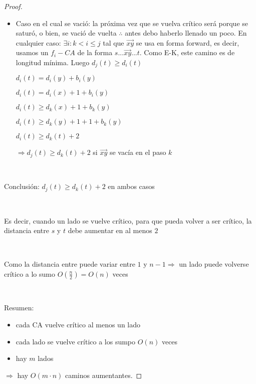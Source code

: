 \documentclass[11pt]{article}
\begin{document}
\begin{proof}
\begin{itemize}
\item Caso en el cual se vació: la próxima vez que se vuelva crítico será porque se saturó, o bien, se vació de vuelta $\therefore$ antes debo haberlo llenado un poco. En cualquier caso: $\exists i: k < i \le j$ tal que $\overrightarrow{xy}$ se usa en forma forward, es decir, usamos un $f_i-CA$ de la forma $s...\overrightarrow{xy}...t$. Como E-K, este camino es de longitud mínima. Luego $d_j(t) \ge d_i(t)$\par
	\begin{center}
		$d_i(t) = d_i(y) + b_i(y)$\par
		$d_i(t) = d_i(x) + 1 + b_i(y)$\par
		$d_i(t) \ge d_k(x) + 1 + b_k(y)$\par
		$d_i(t) \ge d_k(y) + 1 + 1 + b_k(y)$\par
		$d_i(t) \ge d_k(t) + 2$\par
	\end{center}
$\Rightarrow d_j(t) \ge d_k(t) + 2$ si $\overrightarrow{xy}$ se vacía en el paso $k$\par
\
\end{itemize}

Conclusión: $d_j(t) \ge d_k(t) + 2$ en ambos casos\par
\

Es decir, cuando un lado se vuelve crítico, para que pueda volver a ser crítico, la distancia entre $s$ y $t$ debe aumentar en al menos $2$\par
\

Como la distancia entre puede variar entre $1$ y $n-1 \Rightarrow$ un lado puede volverse crítico a lo sumo $O(\frac{n}{2}) = O(n)$ veces\par
\


Resumen:\par
\begin{center}
\begin{itemize}

\item cada CA vuelve crítico al menos un lado\par
\item cada lado se vuelve crítico a los sumpo $O(n)$ veces\par
\item hay $m$ lados\par

\end{itemize}
\end{center}

$\Rightarrow$ hay $O(m \cdot n)$ caminos aumentantes.

\end{proof}  
\end{document}
